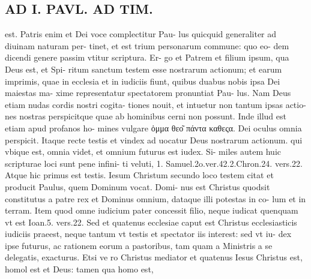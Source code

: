 \documentclass{article}
\begin{document}
\begin{pages}
\section*{AD I. PAVL. AD TIM. }
\marginpar{[ p. ]}\pstart est. Patris enim et Dei voce complectitur Pau- lus quicquid generaliter ad diuinam naturam per- tinet, et est trium personarum commune: quo eo- dem dicendi genere passim vtitur scriptura. Er- go et Patrem et filium ipsum, qua Deus est, et Spi- ritum sanctum testem esse nostrarum actionum; et earum imprimis, quae in ecclesia et in iudiciis fiunt, quibus duabus nobis ipsa Dei maiestas ma- xime representatur spectatorem pronuntiat Pau- lus. Nam Deus etiam nudas cordis nostri cogita- tiones nouit, et intuetur non tantum ipsas actio- nes nostras perspicitque quae ab hominibus cerni non possunt. Inde illud est etiam apud profanos ho- mines vulgare ὁμμα θεο͂ πάντα καθεςα. Dei oculus omnia perspicit. Itaque recte testis et vindex ad uocatur Deus nostrarum actionum. qui vbique est, omnia videt, et omnium futurus est iudex. Si- miles autem huic scripturae loci sunt pene infini- ti veluti, 1. Samuel.2o.ver.42.2.Chron.24. vers.22. Atque hic primus est testis. Iesum Christum secundo loco testem citat et producit Paulus, quem Dominum vocat. Domi- nus est Christus quodsit constitutus a patre rex et Dominus omnium, dataque illi potestas in co- lum et in terram. Item quod omne iudicium pater concessit filio, neque iudicat quenquam vt est Ioan.5. vers.22. Sed et quatenus ecclesiae caput est Christus ecclesiasticis iudiciis praeest, neque tantum vt testis et spectator iis interest: sed vt iu- dex ipse futurus, ac rationem eorum a pastoribus, tam quam a Ministris a se delegatis, exacturus. Etsi ve ro Christus mediator et quatenus Iesus Christus est, homol est et Deus: tamen qua homo est,  \pend

\end{pages}
\end{document}
